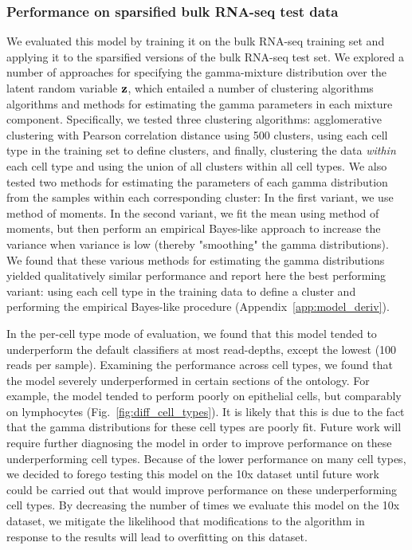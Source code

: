  \subsubsection{Performance on sparsified bulk RNA-seq test data}
 
 We evaluated this model by training it on the bulk RNA-seq training set and applying it to the sparsified versions of the bulk RNA-seq test set.  We explored a number of approaches for specifying the gamma-mixture distribution over the latent random variable $\bold{z}$, which entailed a number of clustering algorithms algorithms and methods for estimating the gamma parameters in each mixture component.  Specifically, we tested three clustering algorithms: agglomerative clustering with Pearson correlation distance using 500 clusters, using each cell type in the training set to define clusters, and finally, clustering the data \textit{within} each cell type and using the union of all clusters within all cell types.  We also tested two methods for estimating the parameters of each gamma distribution from the samples within each corresponding cluster: In the first variant, we use method of moments. In the second variant, we fit the mean using method of moments, but then perform an empirical Bayes-like approach to increase the variance when variance is low (thereby "smoothing" the gamma distributions).  We found that these various methods for estimating the gamma distributions yielded qualitatively similar performance and report here the best performing variant: using each cell type in the training data to define a cluster and performing the empirical Bayes-like procedure (Appendix~\ref{app:model_deriv}). 
 
In the per-cell type mode of evaluation, we found that this model tended to underperform the default classifiers at most read-depths, except the lowest (100 reads per sample).  Examining the performance across cell types, we found that the model severely underperformed in certain sections of the ontology.  For example, the model tended to perform poorly on epithelial cells, but comparably on lymphocytes (Fig.~\ref{fig:diff_cell_types}).  It is likely that this is due to the fact that the gamma distributions for these cell types are poorly fit. Future work will require further diagnosing the model in order to improve performance on these underperforming cell types. Because of the lower performance on many cell types, we decided to forego testing this model on the 10x dataset until future work could be carried out that would improve performance on these underperforming cell types.  By decreasing the number of times we evaluate this model on the 10x dataset, we mitigate the likelihood that modifications to the algorithm in response to the results will lead to overfitting on this dataset.

